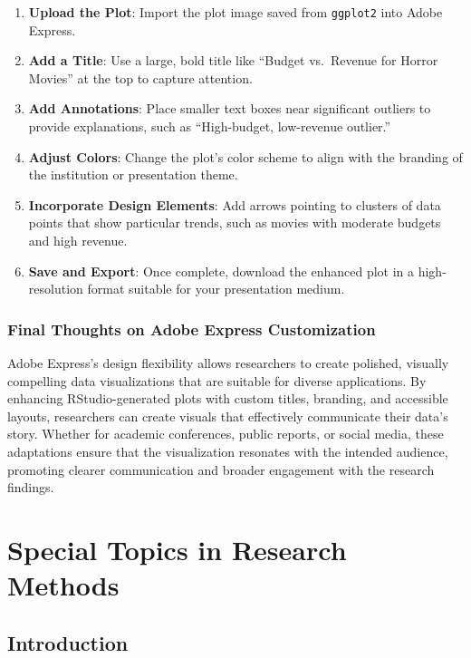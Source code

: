 \documentclass[
]{book}
\providecommand{\tightlist}{%
  \setlength{\itemsep}{0pt}\setlength{\parskip}{0pt}}
\begin{document}
\begin{enumerate}
\def\labelenumi{\arabic{enumi}.}
\tightlist
\item
  \textbf{Upload the Plot}: Import the plot image saved from \texttt{ggplot2} into Adobe Express.
\item
  \textbf{Add a Title}: Use a large, bold title like ``Budget vs.~Revenue for Horror Movies'' at the top to capture attention.
\item
  \textbf{Add Annotations}: Place smaller text boxes near significant outliers to provide explanations, such as ``High-budget, low-revenue outlier.''
\item
  \textbf{Adjust Colors}: Change the plot's color scheme to align with the branding of the institution or presentation theme.
\item
  \textbf{Incorporate Design Elements}: Add arrows pointing to clusters of data points that show particular trends, such as movies with moderate budgets and high revenue.
\item
  \textbf{Save and Export}: Once complete, download the enhanced plot in a high-resolution format suitable for your presentation medium.
\end{enumerate}

\subsection*{Final Thoughts on Adobe Express Customization}\label{final-thoughts-on-adobe-express-customization}

Adobe Express's design flexibility allows researchers to create polished, visually compelling data visualizations that are suitable for diverse applications. By enhancing RStudio-generated plots with custom titles, branding, and accessible layouts, researchers can create visuals that effectively communicate their data's story. Whether for academic conferences, public reports, or social media, these adaptations ensure that the visualization resonates with the intended audience, promoting clearer communication and broader engagement with the research findings.

\chapter{Special Topics in Research Methods}\label{special-topics-in-research-methods}

\section{Introduction}\label{introduction-2}
\end{document}
